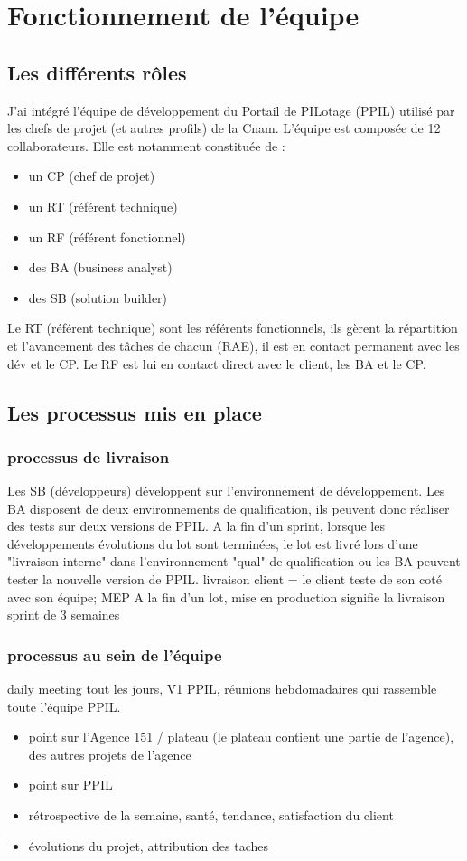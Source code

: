 \section{Fonctionnement de l'équipe}
\subsection{Les différents rôles}
J'ai intégré l'équipe de développement du Portail de PILotage (PPIL) utilisé par les chefs de projet (et autres profils) de la Cnam. L'équipe est composée de 12 collaborateurs. Elle est notamment constituée de :
\begin{itemize}
    \item un CP (chef de projet) 
    \item un RT (référent technique)
    \item un RF (référent fonctionnel)
    \item des BA (business analyst)
    \item des SB (solution builder)
\end{itemize}
Le RT (référent technique) sont les référents fonctionnels, ils gèrent la répartition et l'avancement des tâches de chacun (RAE), il est en contact permanent avec les dév et le CP. Le RF est lui en contact direct avec le client, les BA et le CP.
\subsection{Les processus mis en place}
\subsubsection{processus de livraison}
Les SB (développeurs) développent sur l'environnement de développement.
Les BA disposent de deux environnements de qualification, ils peuvent donc réaliser des tests sur deux versions de PPIL.
A la fin d'un sprint, lorsque les développements évolutions du lot sont terminées, le lot est livré lors d'une "livraison interne" dans l'environnement "qual" de qualification ou les BA peuvent tester la nouvelle version de PPIL.
livraison client = le client teste de son coté avec son équipe;
MEP A la fin d'un lot, mise en production signifie la livraison
sprint de 3 semaines
\subsubsection{processus au sein de l'équipe}
daily meeting tout les jours, 
V1 PPIL, réunions hebdomadaires qui rassemble toute l'équipe PPIL.
\begin{itemize}
    \item point sur l'Agence 151 / plateau (le plateau contient une partie de l'agence), des autres projets de l'agence
    \item point sur PPIL
    \item rétrospective de la semaine, santé, tendance, satisfaction du client
    \item évolutions du projet, attribution des taches
\end{itemize}
